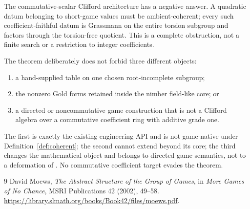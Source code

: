 \documentclass[11pt]{article}
\theoremstyle{definition}
\theoremstyle{remark}
\begin{document}
The commutative-scalar
Clifford architecture has a negative answer.  A quadratic datum belonging to
short-game values must be ambient-coherent; every such coefficient-faithful
datum is Grassmann on the entire torsion subgroup and factors through the
torsion-free quotient.  This is a complete obstruction, not a finite search or
a restriction to integer coefficients.

The theorem deliberately does not forbid three different objects:
\begin{enumerate}[leftmargin=2em]
\item a hand-supplied table on one chosen root-incomplete subgroup;
\item the nonzero Gold forms retained inside the nimber field-like core; or
\item a directed or noncommutative game construction that is not a Clifford
      algebra over a commutative coefficient ring with additive grade one.
\end{enumerate}
The first is exactly the existing engineering API and is not game-native under
Definition~\ref{def:coherent}; the second cannot extend beyond its core; the
third changes the mathematical object and belongs to directed game semantics,
not to a deformation of . No commutative coefficient target
evades the theorem.

\begin{thebibliography}{9}
David Moews,
\emph{The Abstract Structure of the Group of Games},
in \emph{More Games of No Chance}, MSRI Publications 42 (2002), 49--58.
\url{https://library.slmath.org/books/Book42/files/moews.pdf}.
\end{thebibliography}
\end{document}
